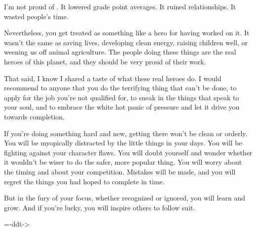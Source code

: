I'm not proud of \doom{}.  It lowered grade point averages.  It ruined relationships.  It wasted people's time.\\
\par
Nevertheless, you get treated as something like a hero for having worked on it.  It wasn't the same as saving lives, developing clean energy, raising children well, or weening us off animal agriculture.  The people doing these things are the real heroes of this planet, and they should be very proud of their work.\\
\par
That said, I know I shared a taste of what these real heroes do.  I would recommend to anyone that you do the terrifying thing that can't be done, to apply for the job you're not qualified for, to sneak in the things that speak to your soul, and to embrace the white hot panic of pressure and let it drive you towards completion.\\
\par
If you're doing something hard and new, getting there won't be clean or orderly.  You will be myopically distracted by the little things in your days.  You will be fighting against your character flaws.  You will doubt yourself and wonder whether it wouldn't be wiser to do the safer, more popular thing.  You will worry about the timing and about your competition.  Mistakes will be made, and you will regret the things you had hoped to complete in time.\\
\par
But in the fury of your focus, whether recognized or ignored, you will learn and grow.  And if you're lucky, you will inspire others to follow suit.\\
\par
        =-ddt->\\
\par
